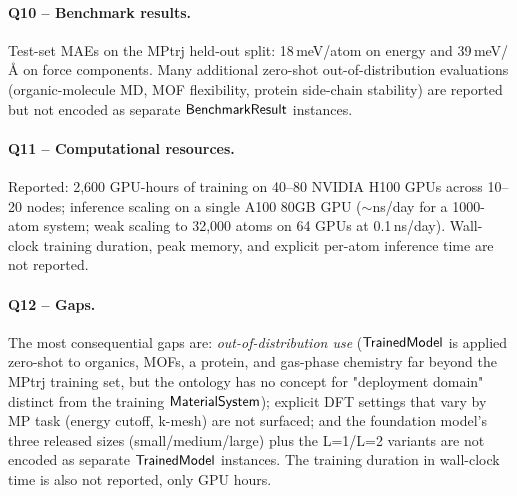 \paragraph{Q10 -- Benchmark results.}
Test-set MAEs on the MPtrj held-out split: 18\,meV/atom on energy and
39\,meV/\AA{} on force components. Many additional zero-shot
out-of-distribution evaluations (organic-molecule MD, MOF flexibility,
protein side-chain stability) are reported but not encoded as
separate $\mathsf{BenchmarkResult}$ instances.


\paragraph{Q11 -- Computational resources.}
Reported: 2{,}600 GPU-hours of training on 40--80 NVIDIA H100 GPUs
across 10--20 nodes; inference scaling on a single A100 80GB GPU
(${\sim}$ns/day for a 1000-atom system; weak scaling to 32{,}000 atoms
on 64 GPUs at 0.1\,ns/day). Wall-clock training duration, peak
memory, and explicit per-atom inference time are not reported.


\paragraph{Q12 -- Gaps.}
The most consequential gaps are: \emph{out-of-distribution use}
($\mathsf{TrainedModel}$ is applied zero-shot to organics, MOFs, a
protein, and gas-phase chemistry far beyond the MPtrj training set,
but the ontology has no concept for "deployment domain" distinct from
the training $\mathsf{MaterialSystem}$); explicit DFT settings that vary by
MP task (energy cutoff, k-mesh) are not surfaced; and the foundation
model's three released sizes (small/medium/large) plus the L=1/L=2
variants are not encoded as separate $\mathsf{TrainedModel}$ instances. The
training duration in wall-clock time is also not reported, only GPU
hours.
